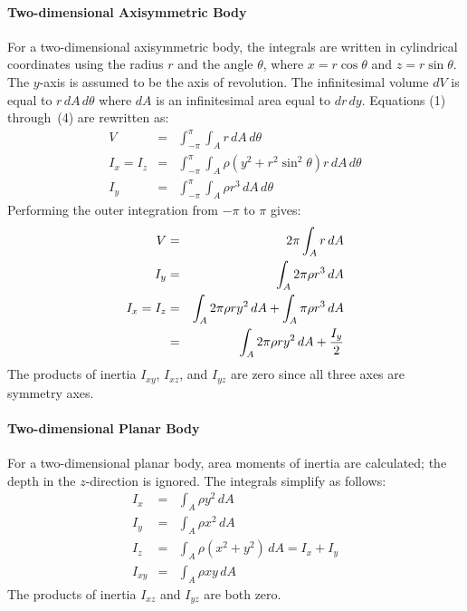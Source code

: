 \paragraph{Two-dimensional Axisymmetric Body}
For a two-dimensional axisymmetric body, the integrals are written in
cylindrical coordinates using the radius $r$ and the angle $\theta$,
where $x = r\cos\theta$ and $z = r\sin\theta$.  The $y$-axis is
assumed to be the axis of revolution.  The infinitesimal volume $dV$
is equal to $r\,dA\,d\theta$ where $dA$ is an infinitesimal area
equal to $dr\,dy$. Equations (1) through~(4) are rewritten as: 
\begin{eqnarray}
V   &=& \int_{-\pi}^\pi\int_A r\,dA\,d\theta   \\
I_x = I_z &=&\int_{-\pi}^\pi\int_A 
              \rho\left(y^2 + r^2\sin^2\theta\right)r\,dA\,d\theta\\ 
I_y &=& \int_{-\pi}^\pi\int_A \rho r^3\,dA\,d\theta 
\end{eqnarray}
Performing the outer integration from $-\pi$ to $\pi$ gives:
\begin{eqnarray}
V   &=& 2\pi\int_A r\,dA   \\
I_y &=& \int_A 2\pi\rho r^3\,dA   \\
I_x = I_z &=& \int_A 2\pi\rho r y^2\,dA + \int_A \pi\rho r^3\,dA\\
    &=& \int_A 2\pi\rho r y^2\,dA + {I_y\over2}  
\end{eqnarray}
The products of inertia $I_{xy}$, $I_{xz}$, and $I_{yz}$ are zero since
all three axes are symmetry axes.  

\paragraph{Two-dimensional Planar Body}
For a two-dimensional planar body, area moments of inertia are
calculated; the depth in the $z$-direction is ignored. The integrals
simplify as follows: 
\begin{eqnarray}
 I_x    &=& \int_A \rho y^2\,dA                   \\
 I_y    &=& \int_A \rho x^2\,dA                   \\
 I_z    &=& \int_A \rho\left(x^2 + y^2\right)\,dA = I_x + I_y \\
 I_{xy} &=& \int_A \rho xy\,dA                    
\end{eqnarray}
The products of inertia $I_{xz}$ and $I_{yz}$ are both zero.

